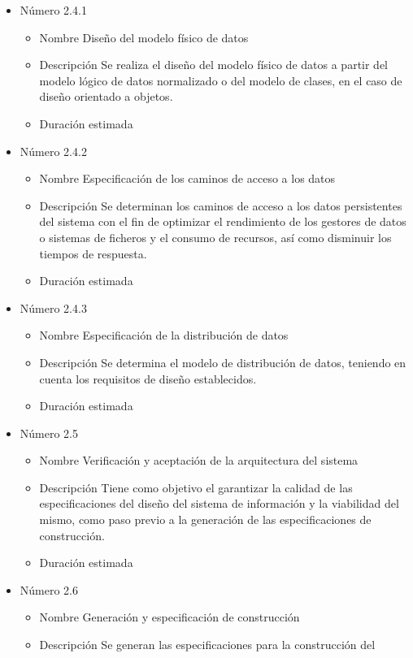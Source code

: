 \documentclass[11pt,a4paper,spanish,twoside]{report}
\begin{document}
\begin{itemize}
\begin{itemize}
\item{Número} 2.4.1
\begin{itemize}
\item{Nombre} Diseño del modelo físico de datos
\item{Descripción} Se realiza el diseño del modelo físico de datos a partir 
del modelo lógico de datos normalizado o del modelo de clases, en el caso de 
diseño orientado a objetos.
\item{Duración estimada} 
\end{itemize}
\item{Número} 2.4.2
\begin{itemize}
\item{Nombre} Especificación de los caminos de acceso a los datos
\item{Descripción} Se determinan los caminos de acceso a los datos persistentes
del sistema con el fin de optimizar el rendimiento de los gestores de datos o 
sistemas de ficheros y el consumo de recursos, así como disminuir los tiempos 
de respuesta.
\item{Duración estimada} 
\end{itemize}
\item{Número} 2.4.3
\begin{itemize}
\item{Nombre} Especificación de la distribución de datos
\item{Descripción} Se determina el modelo de distribución de datos, teniendo en
cuenta los requisitos de diseño establecidos.
\item{Duración estimada} 
\end{itemize}
\item{Número} 2.5
\begin{itemize}
\item{Nombre} Verificación y aceptación de la arquitectura del sistema
\item{Descripción} Tiene como objetivo el garantizar la calidad de las 
especificaciones del diseño del sistema de información y la viabilidad del 
mismo, como paso previo a la generación de las especificaciones de 
construcción.
\item{Duración estimada} 
\end{itemize}
\item{Número} 2.6
\begin{itemize}
\item{Nombre} Generación y especificación de construcción
\item{Descripción} Se generan las especificaciones para la construcción del 

\end{itemize}
\end{itemize}
\end{itemize}
\end{document}

